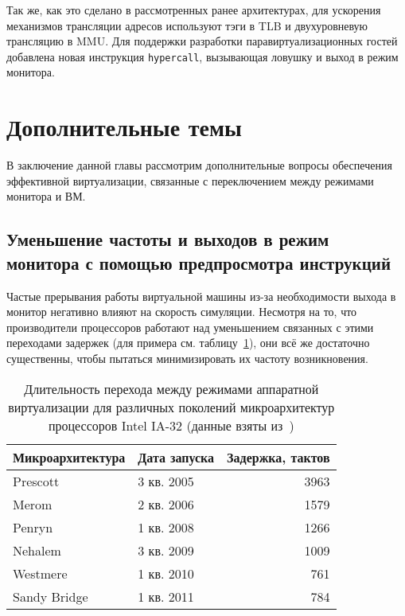 Так же, как это сделано в рассмотренных ранее архитектурах, для ускорения механизмов трансляции адресов используют тэги в TLB и двухуровневую трансляцию в MMU. Для поддержки разработки паравиртуализационных гостей добавлена новая инструкция \texttt{hypercall}, вызывающая ловушку и выход в режим монитора.

\section{Дополнительные темы}

В заключение данной главы рассмотрим дополнительные вопросы обеспечения эффективной виртуализации, связанные с переключением между режимами монитора и ВМ.

\subsection[Уменьшение частоты и выходов в монитор]{Уменьшение частоты и выходов в режим монитора с помощью предпросмотра инструкций}

Частые прерывания работы виртуальной машины из-за необходимости выхода в монитор негативно влияют на скорость симуляции.  Несмотря на то, что производители процессоров работают над уменьшением связанных с этими переходами задержек (для примера см. таблицу~\ref{tab:vmexit-latency}), они всё же достаточно существенны, чтобы пытаться минимизировать их частоту возникновения.

\begin{table}[htb]
\centering
\begin{tabular}{|l|l|r|}\hline
\textbf{Микроархитектура} & \textbf{Дата запуска} & \textbf{Задержка, тактов} \\\hline
Prescott     & 3 кв. 2005 & 3963 \\\hline
Merom        & 2 кв. 2006 & 1579 \\\hline
Penryn       & 1 кв. 2008 & 1266 \\\hline
Nehalem      & 3 кв. 2009 & 1009 \\\hline
Westmere     & 1 кв. 2010 & 761 \\\hline
Sandy Bridge & 1 кв. 2011 & 784 \\\hline
\end{tabular}
\caption[Длительность перехода между режимами аппаратной виртуализации]{Длительность перехода между режимами аппаратной виртуализации для различных поколений микроархитектур процессоров Intel IA-32 (данные взяты из~\cite{Agesen:2012:STA:2342821.2342856})}
\label{tab:vmexit-latency}
\end{table}

